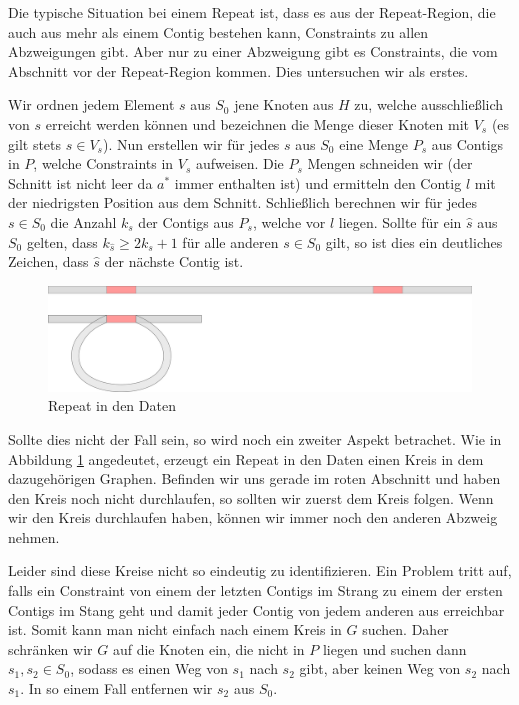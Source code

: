 Die typische Situation bei einem Repeat ist, dass es aus der Repeat-Region, die auch aus mehr als einem Contig bestehen kann, Constraints zu allen Abzweigungen gibt. Aber nur zu einer Abzweigung gibt es Constraints, die vom Abschnitt vor der Repeat-Region kommen. Dies untersuchen wir als erstes.

Wir ordnen jedem Element $s$ aus $S_0$ jene Knoten aus $H$ zu, welche ausschließlich von $s$ erreicht werden können und bezeichnen die Menge dieser Knoten mit $V_s$ (es gilt stets $s \in V_s$). Nun erstellen wir für jedes $s$ aus $S_0$ eine Menge $P_s$ aus Contigs in $P$, welche Constraints in $V_s$ aufweisen. Die $P_s$ Mengen schneiden wir (der Schnitt ist nicht leer da $a^*$ immer enthalten ist) und ermitteln den Contig $l$ mit der niedrigsten Position aus dem Schnitt. Schließlich berechnen wir für jedes $s \in S_0$ die Anzahl $k_s$ der Contigs aus $P_s$, welche vor $l$ liegen. Sollte für ein $\hat{s}$ aus $S_0$ gelten, dass $k_{\hat{s}} \geq 2k_s+1$ für alle anderen $s \in S_0$ gilt, so ist dies ein deutliches Zeichen, dass  $\hat{s}$ der nächste Contig ist. 


\begin{figure}
	\begin{center}
		\includegraphics[width=1\textwidth]{bilder/repeat_kreis}
	\end{center}
	\label{repeat_kreis}
	\caption{Repeat in den Daten}
\end{figure}
Sollte dies nicht der Fall sein, so wird noch ein zweiter Aspekt betrachet. Wie in Abbildung \ref{repeat_kreis} angedeutet, erzeugt ein Repeat in den Daten einen Kreis in dem dazugehörigen Graphen. Befinden wir uns gerade im roten Abschnitt und haben den Kreis noch nicht durchlaufen, so sollten wir zuerst dem Kreis folgen. Wenn wir den Kreis durchlaufen haben, können wir immer noch den anderen Abzweig nehmen.

Leider sind diese Kreise nicht so eindeutig zu identifizieren. 
Ein Problem tritt auf, falls ein Constraint von einem der letzten Contigs im Strang zu einem der ersten Contigs im Stang geht und damit jeder Contig von jedem anderen aus erreichbar ist. Somit kann man nicht einfach nach einem Kreis in $G$ suchen. Daher schränken wir $G$ auf die Knoten ein, die nicht in $P$ liegen und suchen dann $s_1,s_2 \in S_0$, sodass es einen Weg von $s_1$ nach $s_2$ gibt, aber keinen Weg von $s_2$ nach $s_1$. In so einem Fall entfernen wir $s_2$ aus $S_0$.

